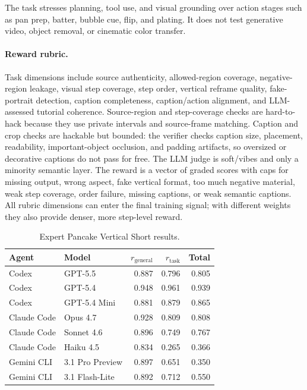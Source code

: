 \documentclass[11pt]{article}
\begin{document}
The task stresses planning, tool use, and visual grounding over action stages such as pan prep, batter, bubble cue, flip, and plating. It does not test generative video, object removal, or cinematic color transfer.

\paragraph{Reward rubric.}
Task dimensions include source authenticity, allowed-region coverage, negative-region leakage, visual step coverage, step order, vertical reframe quality, fake-portrait detection, caption completeness, caption/action alignment, and LLM-assessed tutorial coherence. Source-region and step-coverage checks are hard-to-hack because they use private intervals and source-frame matching. Caption and crop checks are hackable but bounded: the verifier checks caption size, placement, readability, important-object occlusion, and padding artifacts, so oversized or decorative captions do not pass for free. The LLM judge is soft/vibes and only a minority semantic layer. The reward is a vector of graded scores with caps for missing output, wrong aspect, fake vertical format, too much negative material, weak step coverage, order failure, missing captions, or weak semantic captions. All rubric dimensions can enter the final training signal; with different weights they also provide denser, more step-level reward.

\begin{table}[H]
\centering
\small
\begin{tabular}{llrrr}
\toprule
Agent & Model & \(r_{\mathrm{general}}\) & \(r_{\mathrm{task}}\) & Total \\
\midrule
Codex & GPT-5.5 & 0.887 & 0.796 & 0.805 \\
Codex & GPT-5.4 & 0.948 & 0.961 & 0.939 \\
Codex & GPT-5.4 Mini & 0.881 & 0.879 & 0.865 \\
Claude Code & Opus 4.7 & 0.928 & 0.809 & 0.808 \\
Claude Code & Sonnet 4.6 & 0.896 & 0.749 & 0.767 \\
Claude Code & Haiku 4.5 & 0.834 & 0.265 & 0.366 \\
Gemini CLI & 3.1 Pro Preview & 0.897 & 0.651 & 0.350 \\
Gemini CLI & 3.1 Flash-Lite & 0.892 & 0.712 & 0.550 \\
\bottomrule
\end{tabular}
\caption{Expert Pancake Vertical Short results.}
\end{table}
\end{document}
